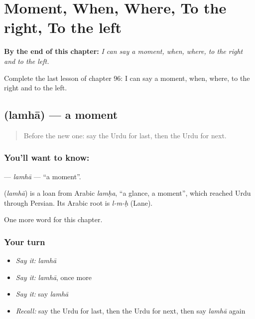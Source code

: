 
\chapter{Moment, When, Where, To the right, To the left}
\label{ch:ur-moment-when-where-to-the-right-to-the-left}

\begin{chapteropening}
\textbf{By the end of this chapter:} \emph{I can say a moment, when, where, to the right and to the left.}

Complete the last lesson of chapter 96: I can say a moment, when, where, to the right and to the left.
\end{chapteropening}

\section[\texorpdfstring{\ur{لمحہ} (lamhā)}{لمحہ (lamhā)}]{ (lamhā) — a moment}

\label{lesson:UR-C96-lamha}



\begin{quote}
Before the new one: say the Urdu for last, then the Urdu for next.
\end{quote}

\subsection*{You'll want to know: }
\textbf{} — \emph{lamhā} — \textquotedblleft{}a moment\textquotedblright{}.

\begin{cousinweb}
\textbf{} (\emph{lamhā}) is a loan from Arabic \emph{lamḥa}, \textquotedblleft{}a glance, a moment\textquotedblright{}, which reached Urdu through Persian. Its Arabic root is \emph{l-m-ḥ} (Lane).
\end{cousinweb}

\begin{grammarlens}[title={What you've built}]
One more word for this chapter.
\end{grammarlens}

\subsection*{Your turn}
\begin{itemize}
\raggedright
  \item \emph{Say it:} \emph{lamhā}
  \item \emph{Say it:} \emph{lamhā}, once more
  \item \emph{Say it:} say \emph{lamhā}
  \item \emph{Recall:} say the Urdu for last, then the Urdu for next, then say \emph{lamhā} again
\end{itemize}

